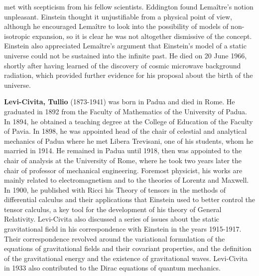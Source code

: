 met with scepticism from his fellow scientists. Eddington found Lemaître's notion unpleasant. Einstein thought it unjustifiable from a physical point of view, although he encouraged Lemaître to look into the possibility of models of non-isotropic expansion, so it is clear he was not altogether dismissive of the concept. Einstein also appreciated Lemaître's argument that Einstein's model of a static universe could not be sustained into the infinite past. He died on 20 June 1966, shortly after having learned of the discovery of cosmic microwave background radiation, which provided further evidence for his proposal about the birth of the universe.

\textbf{Levi-Civita, Tullio} (1873-1941) was born in Padua and died in Rome. He graduated in 1892 from the Faculty of Mathematics of the University of Padua. In 1894, he obtained a teaching degree at the College of Education of the Faculty of Pavia. In 1898, he was appointed head of the chair of celestial and analytical mechanics of Padua where he met Libera Trevisani, one of his students, whom he married in 1914. He remained in Padua until 1918, then was appointed to the chair of analysis at the University of Rome, where he took two years later the chair of professor of mechanical engineering. Foremost physicist, his works are mainly related to electromagnetism and to the theories of Lorentz and Maxwell. In 1900, he published with Ricci his Theory of tensors in the methods of differential calculus and their applications that Einstein used to better control the tensor calculus, a key tool for the development of his theory of General Relativity. Levi-Civita also discussed a series of issues about the static gravitational field in his correspondence with Einstein in the years 1915-1917. Their correspondence revolved around the variational formulation of the equations of gravitational fields and their covariant properties, and the definition of the gravitational energy and the existence of gravitational waves. Levi-Civita in 1933 also contributed to the Dirac equations of quantum mechanics.

